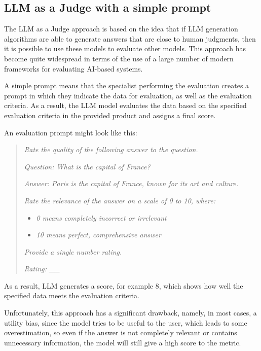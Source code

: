 \documentclass[sn-basic]{sn-jnl}
\theoremstyle{thmstyleone}%
\theoremstyle{thmstyletwo}%
\theoremstyle{thmstylethree}%
\begin{document}
\subsection{LLM as a Judge with a simple prompt}

The LLM as a Judge approach \cite{Zheng2023} is based on the idea that if LLM generation algorithms are able to generate answers that are close to human judgments, then it is possible to use these models to evaluate other models. This approach has become quite widespread in terms of the use of a large number of modern frameworks for evaluating AI-based systems.

A simple prompt means that the specialist performing the evaluation creates a prompt in which they indicate the data for evaluation, as well as the evaluation criteria. As a result, the LLM model evaluates the data based on the specified evaluation criteria in the provided product and assigns a final score.

An evaluation prompt might look like this: 

\begin{quote}
\textit{Rate the quality of the following answer to the question.} 

\textit{Question: What is the capital of France?} 

\textit{Answer: Paris is the capital of France, known for its art and culture.} 

\textit{Rate the relevance of the answer on a scale of 0 to 10, where:} 
\begin{itemize} 
\item \textit{0 means completely incorrect or irrelevant} 
\item \textit{10 means perfect, comprehensive answer} 
\end{itemize} 

\textit{Provide a single number rating.} 

\textit{Rating: \_\_} 
\end{quote}

As a result, LLM generates a score, for example 8, which shows how well the specified data meets the evaluation criteria.

Unfortunately, this approach has a significant drawback, namely, in most cases, a utility bias, since the model tries to be useful to the user, which leads to some overestimation, so even if the answer is not completely relevant or contains unnecessary information, the model will still give a high score to the metric.
\end{document}
